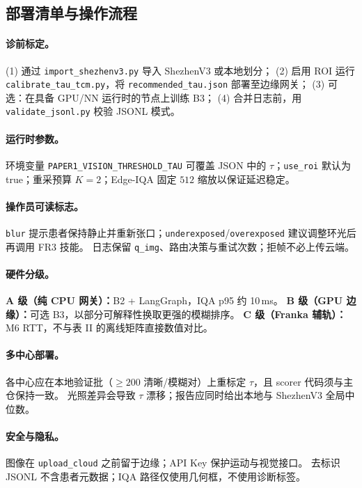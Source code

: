 \subsection{部署清单与操作流程}
\label{sec:deploy-checklist-zh}

\paragraph{诊前标定。}
(1) 通过 \texttt{import\_shezhenv3.py} 导入 ShezhenV3 或本地划分；
(2) 启用 ROI 运行 \texttt{calibrate\_tau\_tcm.py}，将 \texttt{recommended\_tau.json} 部署至边缘网关；
(3) 可选：在具备 GPU/NN 运行时的节点上训练 B3；
(4) 合并日志前，用 \texttt{validate\_jsonl.py} 校验 JSONL 模式。

\paragraph{运行时参数。}
环境变量 \texttt{PAPER1\_VISION\_THRESHOLD\_TAU} 可覆盖 JSON 中的 $\tau$；\texttt{use\_roi} 默认为 true；重采预算 $K{=}2$；Edge-IQA 固定 $512$ 缩放以保证延迟稳定。

\paragraph{操作员可读标志。}
\texttt{blur} 提示患者保持静止并重新张口；\texttt{underexposed}/\texttt{overexposed} 建议调整环光后再调用 FR3 技能。
日志保留 \texttt{q\_img}、路由决策与重试次数；拒帧不必上传云端。

\paragraph{硬件分级。}
\textbf{A 级（纯 CPU 网关）：}B2 + LangGraph，IQA p95 约 10\,ms。
\textbf{B 级（GPU 边缘）：}可选 B3，以部分可解释性换取更强的模糊排序。
\textbf{C 级（Franka 辅轨）：}M6 RTT，不与表 II 的离线矩阵直接数值对比。

\paragraph{多中心部署。}
各中心应在本地验证批（$\geq 200$ 清晰/模糊对）上重标定 $\tau$，且 scorer 代码须与主仓保持一致。
光照差异会导致 $\tau$ 漂移；报告应同时给出本地与 ShezhenV3 全局中位数。

\paragraph{安全与隐私。}
图像在 \texttt{upload\_cloud} 之前留于边缘；API Key 保护运动与视觉接口。
去标识 JSONL 不含患者元数据；IQA 路径仅使用几何框，不使用诊断标签。

